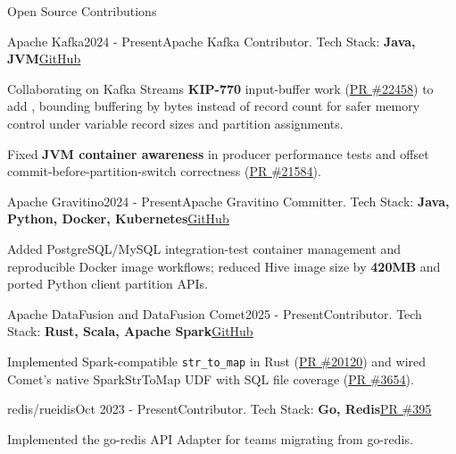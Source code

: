 \documentclass[
	11pt, %
]{resume} %
\begin{document}
\begin{rSection}{Open Source Contributions}
\begin{rSubsection}{Apache Kafka}{2024 - Present}{Apache Kafka Contributor. Tech Stack: {\color{teal}\textbf{Java, JVM}}}{{\color{teal}\underline{\href{https://github.com/apache/kafka}{GitHub}}}}
		\item Collaborating on Kafka Streams \textbf{KIP-770} input-buffer work ({\color{teal}\underline{\href{https://github.com/apache/kafka/pull/22458}{PR \#22458}}}) to add , bounding buffering by bytes instead of record count for safer memory control under variable record sizes and partition assignments.
		\item Fixed \textbf{JVM container awareness} in producer performance tests and offset commit-before-partition-switch correctness ({\color{teal}\underline{\href{https://github.com/apache/kafka/pull/21584}{PR \#21584}}}).
	\end{rSubsection}

\begin{rSubsection}{Apache Gravitino}{2024 - Present}{Apache Gravitino Committer. Tech Stack: {\color{teal}\textbf{Java, Python, Docker, Kubernetes}}}{{\color{teal}\underline{\href{https://github.com/apache/gravitino}{GitHub}}}}
		\item Added PostgreSQL/MySQL integration-test container management and reproducible Docker image workflows; reduced Hive image size by \textbf{420MB} and ported Python client partition APIs.
	\end{rSubsection}

\begin{rSubsection}{Apache DataFusion and DataFusion Comet}{2025 - Present}{Contributor. Tech Stack: {\color{teal}\textbf{Rust, Scala, Apache Spark}}}{{\color{teal}\underline{\href{https://github.com/apache/datafusion}{GitHub}}}}
		\item Implemented Spark-compatible \texttt{str\_to\_map} in Rust ({\color{teal}\underline{\href{https://github.com/apache/datafusion/pull/20120}{PR \#20120}}}) and wired Comet's native SparkStrToMap UDF with SQL file coverage ({\color{teal}\underline{\href{https://github.com/apache/datafusion-comet/pull/3654}{PR \#3654}}}).
	\end{rSubsection}

\begin{rSubsection}{redis/rueidis}{Oct 2023 - Present}{Contributor. Tech Stack: {\color{teal}\textbf{Go, Redis}}}{{\color{teal}\underline{\href{https://github.com/redis/rueidis/pull/395}{PR \#395}}}}
		\item Implemented the go-redis API Adapter for teams migrating from go-redis.
	\end{rSubsection}
\end{rSection}
\end{document}
